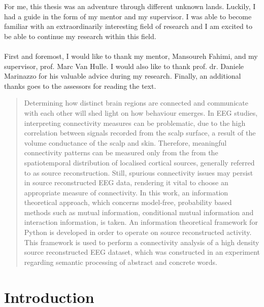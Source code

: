 \documentclass[master=mai, masteroption=ecs]{kulemt}
\begin{document}
\renewcommand{\prefacename}{Acknowledgements}
\begin{preface}
  For me, this thesis was an adventure through different unknown lands. Luckily, I had a guide in the form of my mentor and my supervisor. I was able to become familiar with an extraordinarily interesting field of research and I am excited to be able to continue my research within this field. \\ 
\\
First and foremost, I would like to thank my mentor, Mansoureh Fahimi, and my supervisor, prof. Marc Van Hulle. I would also like to thank prof. dr. Daniele Marinazzo for his valuable advice during my research. Finally, an additional thanks goes to the assessors for reading the text. 
\end{preface}

\tableofcontents*

\setlength{\parindent}{0pt}
\setlength{\parskip}{1em}

\begin{abstract}
Determining how distinct brain regions are connected and communicate with each other will shed light on how behaviour emerges. In EEG studies, interpreting connectivity measures can be problematic, due to the high correlation between signals recorded from the scalp surface, a result of the volume conductance of the scalp and skin. Therefore, meaningful connectivity patterns can be measured only from the from the spatiotemporal distribution of localised cortical sources, generally referred to as source reconstruction. Still, spurious connectivity issues may persist in source reconstructed EEG data, rendering it vital to choose an appropriate measure of connectivity. In this work, an information theoretical approach, which concerns model-free, probability based methods such as mutual information, conditional mutual information and interaction information, is taken. An information theoretical framework for Python is developed in order to operate on source reconstructed activity. This framework is used to perform a connectivity analysis of a high density source reconstructed EEG dataset, which was constructed in an experiment regarding semantic processing of abstract and concrete words. 
\end{abstract}

\listoffigures

\mainmatter

\chapter{Introduction}

\end{document}
